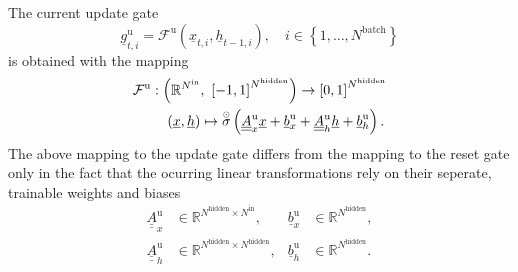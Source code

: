 The current update gate 
\begin{equation}
    \underline g^\text{u}_{t,i} 
    =
    \mathcal{F}^\text{u} \left( \underline x_{t,i}, \underline h_{t-1,i}\right)
    ,\quad i \in \left\{1, \dots, N^\text{batch}\right\}
\end{equation}
is obtained with the mapping
\begin{align} \label{eq:gru_update}
    \mathcal{F}^\text{u}
    &:
    \left(\mathbb{R}^{N^\text{in}},\ \left[-1, 1\right]^{N^\text{hidden}}\right)
    \rightarrow
    \left[0, 1\right]^{N^\text{hidden}}
    \nonumber \\ & \quad
    \left(\underline x,\underline h\right)
    \mapsto
    \overset{\scriptscriptstyle \odot}{\sigma} \left(
        \underline{\underline A}^\text{u}_{x} \underline x
        +
        \underline b^\text{u}_{x}
        +
        \underline{\underline A}^\text{u}_{h} \underline h
        +
        \underline b^\text{u}_{h}
    \right).
\end{align}
The above mapping to the update gate 
differs from the mapping to the reset gate 
only in the fact that the ocurring linear transformations 
rely on their seperate, trainable weights and biases
\begin{align} \label{eq:gru_update_params}
    \underline{\underline A}^\text{u}_{x} & \in \mathbb{R}^{
        N^\text{hidden}
        \times
        N^\text{in}
    },
    & \underline{b}^\text{u}_{x} & \in \mathbb{R}^{N^\text{hidden}},
    \nonumber \\
    \underline{\underline A}^\text{u}_{h} & \in \mathbb{R}^{
        N^\text{hidden}
        \times
        N^\text{hidden}
    },
    & \underline{b}^\text{u}_{h} & \in \mathbb{R}^{N^\text{hidden}}.
\end{align}

